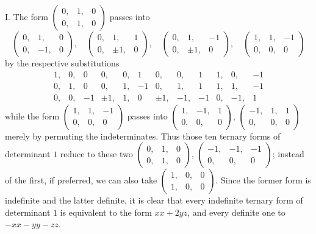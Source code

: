 I. The form \(\left(\begin{smallmatrix}0,&1,&0\\0,&1,&0\end{smallmatrix}\right)\) passes into
\[
\left(\begin{smallmatrix}0,&1,&0\\0,&-1,&0\end{smallmatrix}\right),\quad
\left(\begin{smallmatrix}0,&1,&1\\0,&\pm1,&0\end{smallmatrix}\right),\quad
\left(\begin{smallmatrix}0,&1,&-1\\0,&\pm1,&0\end{smallmatrix}\right),\quad
\left(\begin{smallmatrix}1,&1,&-1\\0,&0,&0\end{smallmatrix}\right)
\]
by the respective substitutions
\[
\begin{array}{rrr|rrr|rrr|rrr}
1,&0,&0&0,&0,&1&0,&0,&1&1,&0,&-1\\
0,&1,&0&0,&1,&-1&0,&1,&1&1,&1,&-1\\
0,&0,&-1&\pm1,&1,&0&\pm1,&-1,&-1&0,&-1,&1
\end{array}
\]
while the form \(\left(\begin{smallmatrix}1,&1,&-1\\0,&0,&0\end{smallmatrix}\right)\) passes into \(\left(\begin{smallmatrix}1,&-1,&1\\0,&0,&0\end{smallmatrix}\right)\), \(\left(\begin{smallmatrix}-1,&1,&1\\0,&0,&0\end{smallmatrix}\right)\) merely by permuting the indeterminates. Thus those ten ternary forms of determinant \(1\) reduce to these two
\(\left(\begin{smallmatrix}0,&1,&0\\0,&1,&0\end{smallmatrix}\right)\), \(\left(\begin{smallmatrix}-1,&-1,&-1\\0,&0,&0\end{smallmatrix}\right)\); instead of the first, if preferred, we can also take \(\left(\begin{smallmatrix}1,&0,&0\\1,&0,&0\end{smallmatrix}\right)\). Since the former form is indefinite and the latter definite, it is clear that every indefinite ternary form of determinant \(1\) is equivalent to the form \(xx+2yz\), and every definite one to \(-xx-yy-zz\).


